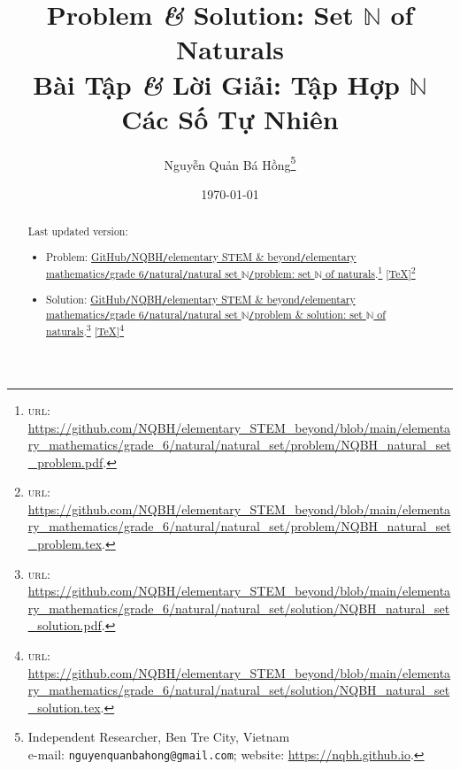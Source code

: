 \documentclass{article}
\title{Problem {\it\&} Solution: Set $\mathbb{N}$ of Naturals\\Bài Tập {\it\&} Lời Giải: Tập Hợp $\mathbb{N}$ Các Số Tự Nhiên}
\author{Nguyễn Quản Bá Hồng\footnote{Independent Researcher, Ben Tre City, Vietnam\\e-mail: \texttt{nguyenquanbahong@gmail.com}; website: \url{https://nqbh.github.io}.}}
\date{\today}
\begin{document}
\maketitle
\begin{abstract}
	Last updated version:
	\begin{itemize}
		\item Problem: \href{https://github.com/NQBH/elementary_STEM_beyond/blob/main/elementary_mathematics/grade_6/natural/natural_set/problem/NQBH_natural_set_problem.pdf}{GitHub{\tt/}NQBH{\tt/}elementary STEM \& beyond{\tt/}elementary mathematics{\tt/}grade 6{\tt/}natural{\tt/}natural set $\mathbb{N}${\tt/}problem: set $\mathbb{N}$ of naturals}.\footnote{\textsc{url}: \url{https://github.com/NQBH/elementary_STEM_beyond/blob/main/elementary_mathematics/grade_6/natural/natural_set/problem/NQBH_natural_set_problem.pdf}.} [\href{https://github.com/NQBH/elementary_STEM_beyond/blob/main/elementary_mathematics/grade_6/natural/natural_set/problem/NQBH_natural_set_problem.tex}{\TeX}]\footnote{\textsc{url}: \url{https://github.com/NQBH/elementary_STEM_beyond/blob/main/elementary_mathematics/grade_6/natural/natural_set/problem/NQBH_natural_set_problem.tex}.}
		\item Solution: \href{https://github.com/NQBH/elementary_STEM_beyond/blob/main/elementary_mathematics/grade_6/natural/natural_set/solution/NQBH_natural_set_solution.pdf}{GitHub{\tt/}NQBH{\tt/}elementary STEM \& beyond{\tt/}elementary mathematics{\tt/}grade 6{\tt/}natural{\tt/}natural set $\mathbb{N}${\tt/}problem \& solution: set $\mathbb{N}$ of naturals}.\footnote{\textsc{url}: \url{https://github.com/NQBH/elementary_STEM_beyond/blob/main/elementary_mathematics/grade_6/natural/natural_set/solution/NQBH_natural_set_solution.pdf}.} [\href{https://github.com/NQBH/elementary_STEM_beyond/blob/main/elementary_mathematics/grade_6/natural/natural_set/solution/NQBH_natural_set_solution.tex}{\TeX}]\footnote{\textsc{url}: \url{https://github.com/NQBH/elementary_STEM_beyond/blob/main/elementary_mathematics/grade_6/natural/natural_set/solution/NQBH_natural_set_solution.tex}.}
	\end{itemize}	
\end{abstract}
\tableofcontents

\end{document}

